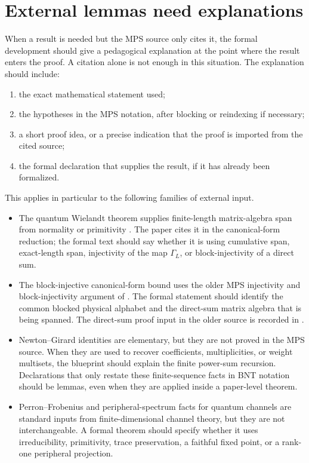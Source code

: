 \documentclass{article}
\begin{document}
\section{External lemmas need explanations}

When a result is needed but the MPS source only cites it, the formal
development should give a pedagogical explanation at the point where the result
enters the proof. A citation alone is not enough in this situation. The
explanation should include:
\begin{enumerate}
  \item the exact mathematical statement used;
  \item the hypotheses in the MPS notation, after blocking or reindexing if
        necessary;
  \item a short proof idea, or a precise indication that the proof is imported
        from the cited source;
  \item the formal declaration that supplies the result, if it has already been
        formalized.
\end{enumerate}

This applies in particular to the following families of external input.
\begin{itemize}
  \item The quantum Wielandt theorem supplies finite-length matrix-algebra span
    from normality or primitivity \cite{Sanz2010Quantum}. The paper cites it in
    the canonical-form reduction; the formal text should say whether it is using
    cumulative span, exact-length span, injectivity of the map $\Gamma_L$, or
    block-injectivity of a direct sum.
  \item The block-injective canonical-form bound uses the older MPS
    injectivity and block-injectivity argument of
    \cite{PerezGarcia2007MPSReps}. The formal statement should identify the
    common blocked physical alphabet and the direct-sum matrix algebra that is
    being spanned. The direct-sum proof input in the older source is recorded
    in .
  \item Newton--Girard identities are elementary, but they are not proved in the
    MPS source. When they are used to recover coefficients, multiplicities, or
    weight multisets, the blueprint should explain the finite power-sum
    recursion.
    Declarations that only restate these finite-sequence facts in BNT notation
    should be lemmas, even when they are applied inside a paper-level theorem.
  \item Perron--Frobenius and peripheral-spectrum facts for quantum channels are
    standard inputs from finite-dimensional channel theory, but they are not
    interchangeable. A formal theorem should specify whether it uses
    irreducibility, primitivity, trace preservation, a faithful fixed point, or
    a rank-one peripheral projection.
\end{itemize}
\end{document}
